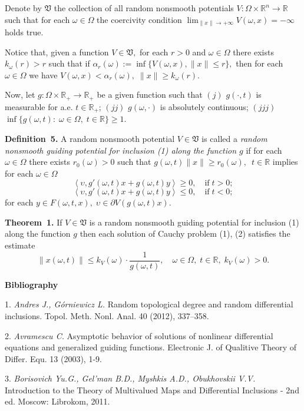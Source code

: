 \noindent Denote by $\mathfrak{V}$ the collection of all random nonsmooth potentials $V: \Omega\times\mathbb{R}^n \to \mathbb{R}$ such that for each $\omega\in\Omega$ the coercivity condition
$
\lim_{\|x\|\to +\infty} V(\omega,x) = -\infty
$
holds true.

Notice that, given a function $V \in \mathfrak{V},$ for each $r>0$ and $\omega\in\Omega$ there exists $k_\omega(r) > r$ such that
if
$
\alpha_r(\omega):=\inf\{V(\omega,x),\|x\|\leq r\},
$
then for each $\omega\in\Omega$ we have
$
 V(\omega,x)< \alpha_r(\omega), \;\|x\|\geq k_\omega(r).
$

Now, let $g:\Omega\times\mathbb{R}_+\to \mathbb{R}_+$ be a given function such that
$(j)$ $g(\cdot, t)$ is measurable for a.e. $t\in\mathbb{R}_+$;
$(jj)$ $g(\omega, \cdot)$ is absolutely continuous;
$(jjj)$ $\inf \{g(\omega,t):\; \omega\in\Omega,\; t\in \mathbb{R}\}\geq 1$.

\textbf{Definition~5.} A random nonsmooth potential $V \in \mathfrak{V}$ is called a {\it random nonsmooth guiding potential for inclusion (1) along the function $g$} if for each $\omega\in\Omega$ there exists $r_0(\omega)>0$ such that $g(\omega,t)\|x\|\ge r_0(\omega),$ \,$t \in \mathbb{R}$ implies for each $\omega\in\Omega$
$$
\left< {\upsilon,g'(\omega,t)x+g(\omega,t)y} \right> \geq 0, \quad \mbox {if} \; t>0;
$$
$$
\left< {\upsilon,g'(\omega,t)x+g(\omega,t)y} \right> \leq 0, \quad \mbox {if}\; t<0;
$$
for each $y\in F(\omega,t,x), \; \upsilon \in \partial V(g(\omega,t)x).$

\textbf{Theorem~1.}
If $V \in \mathfrak{V}$ is a random nonsmooth guiding potential for inclusion (1) along the function $g$
then each solution of Cauchy problem (1), (2) satisfies the estimate
$$
\|x(\omega,t)\|\leq k_V(\omega)\cdot \frac{1}{g(\omega,t)},\quad \omega\in\Omega,\;t\in \mathbb{R}, \; k_V(\omega)>0.
$$
\centerline {\bf Bibliography}

1. {\it Andres J., G\'orniewicz L.} Random topological degree and random differential inclusions. Topol. Meth. Nonl. Anal. 40 (2012), 337--358.

2. {\it Avramescu C.} Asymptotic behavior of solutions of nonli\-near differential equations and generalized guiding functions. Elec\-tronic J. of Qualitive Theory of Differ. Equ. 13 (2003), 1-9.

3. {\it Borisovich Yu.G., Gel'man B.D., Myshkis A.D., Obukho\-vskii V.V.} Introduction to the Theory of Multivalued Maps and Dif\-fe\-ren\-tial Inclusions - 2nd ed. Moscow: Librokom, 2011.

